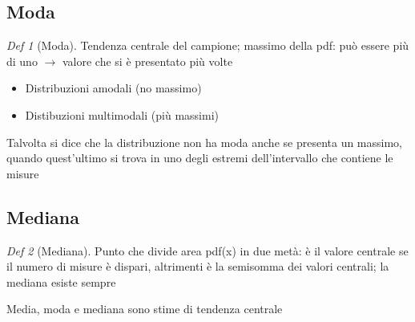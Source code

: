 \documentclass[12pt]{report}
\theoremstyle{remark}
\theoremstyle{theorem}
\newtheorem*{Def}{Def}
\begin{document}
\subsection{Moda}
\begin{Def}[Moda]
	Tendenza centrale del campione; massimo della pdf: può essere più di uno $\to$ valore che si è presentato più volte
	\begin{itemize}
		\item Distribuzioni amodali (no massimo)
		\item Distibuzioni multimodali (più massimi)
	\end{itemize}
Talvolta si dice che la distribuzione non ha moda anche se presenta un massimo, quando quest'ultimo si trova in uno degli estremi dell'intervallo che contiene le misure 	
\end{Def}

\subsection{Mediana}
\begin{Def}[Mediana]
	Punto che divide area pdf(x) in due metà: è il valore centrale se il numero di misure è dispari, altrimenti è la semisomma dei valori centrali; la mediana esiste sempre
\end{Def}
Media, moda e mediana sono stime di tendenza centrale 
\end{document}
